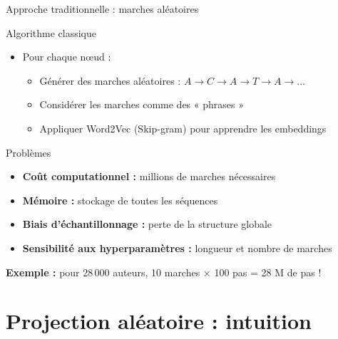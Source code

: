 \documentclass[9pt,aspectratio=169,professionalfonts]{beamer}
\begin{document}
\begin{frame}{Approche traditionnelle : marches aléatoires}
\begin{block}{Algorithme classique}
\begin{itemize}
    \item Pour chaque nœud :
    \begin{itemize}
        \item Générer des marches aléatoires : $A \rightarrow C \rightarrow A \rightarrow T \rightarrow A \rightarrow \dots$
        \item Considérer les marches comme des « phrases »
        \item Appliquer Word2Vec (Skip-gram) pour apprendre les embeddings
    \end{itemize}
\end{itemize}
\end{block}

\begin{alertblock}{Problèmes}
\begin{itemize}
    \item \textbf{Coût computationnel :} millions de marches nécessaires
    \item \textbf{Mémoire :} stockage de toutes les séquences
    \item \textbf{Biais d'échantillonnage :} perte de la structure globale
    \item \textbf{Sensibilité aux hyperparamètres :} longueur et nombre de marches
\end{itemize}
\end{alertblock}

\textbf{Exemple :} pour 28\,000 auteurs, 10 marches × 100 pas = 28 M de pas !
\end{frame}

\section{Projection aléatoire : intuition}
\end{document}
